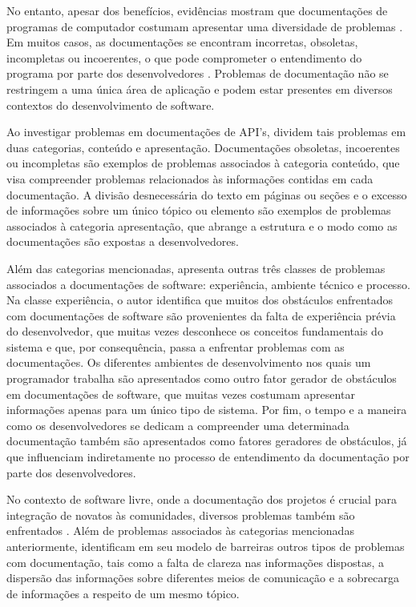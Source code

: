 No entanto, apesar dos benefícios, evidências mostram que documentações de programas de computador costumam apresentar uma diversidade de problemas \citep{briand2003enough}. Em muitos casos, as documentações se encontram incorretas, obsoletas, incompletas ou incoerentes, o que pode comprometer o entendimento do programa por parte dos desenvolvedores \citep{aghajani2019issues, forward2002relevance}. Problemas de documentação não se restringem a uma única área de aplicação e podem estar presentes em diversos contextos do desenvolvimento de software.

Ao investigar problemas em documentações de API's, \citet{uddin2015how} dividem tais problemas em duas categorias, conteúdo e apresentação. Documentações obsoletas, incoerentes ou incompletas são exemplos de problemas associados à categoria conteúdo, que visa compreender problemas relacionados às informações contidas em cada documentação. A divisão desnecessária do texto em páginas ou seções e o excesso de informações sobre um único tópico ou elemento são exemplos de problemas associados à categoria apresentação, que abrange a estrutura e o modo como as documentações são expostas a desenvolvedores.

Além das categorias mencionadas, \citet{robillard2009what} apresenta outras três classes de problemas associados a documentações de software: experiência, ambiente técnico e processo. Na classe experiência, o autor identifica que muitos dos obstáculos enfrentados com documentações de software são provenientes da falta de experiência prévia do desenvolvedor, que muitas vezes desconhece os conceitos fundamentais do sistema e que, por consequência, passa a enfrentar problemas com as documentações. Os diferentes ambientes de desenvolvimento nos quais um programador trabalha são apresentados como outro fator gerador de obstáculos em documentações de software, que muitas vezes costumam apresentar informações apenas para um único tipo de sistema. Por fim, o tempo e a maneira como os desenvolvedores se dedicam a compreender uma determinada documentação também são apresentados como fatores geradores de obstáculos, já que influenciam indiretamente no processo de entendimento da documentação por parte dos desenvolvedores.

No contexto de software livre, onde a documentação dos projetos é crucial para integração de novatos às comunidades, diversos problemas também são enfrentados \citep{gacek2004the, aberdour2007achieving}. Além de problemas associados às categorias mencionadas anteriormente, \citet{steinmacher2014preliminary} identificam em seu modelo de barreiras outros tipos de problemas com documentação, tais como a falta de clareza nas informações dispostas, a dispersão das informações sobre diferentes meios de comunicação e a sobrecarga de informações a respeito de um mesmo tópico.

